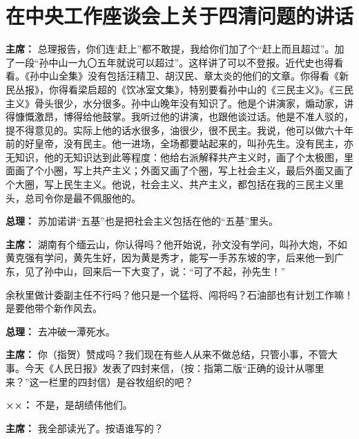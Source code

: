 \section[在中央工作座谈会上关于四清问题的讲话（一九六四年十二月二十日）]{在中央工作座谈会上关于四清问题的讲话}

\begin{duihua}

\item[\textbf{主席：}] 总理报告，你们连‘赶上”都不敢提，我给你们加了个“赶上而且超过”。加了一段“孙中山一九〇五年就说可以超过”。这样讲了可以不登报。近代史也得看看。《孙中山全集》没有包括汪精卫、胡汉民、章太炎的他们的文章。你得看《新民丛报》，你得看梁启超的《饮冰室文集》，特别要看孙中山的《三民主义》。《三民主义》骨头很少，水分很多。孙中山晚年没有知识了。他是个讲演家，煽动家，讲得慷慨激昂，博得给他鼓掌。我听过他的讲演，也跟他谈过话。他是不准人驳的，提不得意见的。实际上他的话水很多，油很少，很不民主。我说，他可以做六十年前的好皇帝，没有民主。他一进场，全场都要站起来的，叫孙先生。没有民主，亦无知识，他的无知识达到此等程度：他给右派解释共产主义时，画了个太极图，里面画了个小圈，写上共产主义；外面又画了个圈，写上社会主义，最后外面又画了个大圈，写上民生主义。他说，社会主义、共产主义，都包括在我的三民主义里头，总司令你是最不佩服他的。

\item[\textbf{总理：}] 苏加诺讲“五基”也是把社会主义包括在他的“五基”里头。

\item[\textbf{主席：}] 湖南有个缅云山，你认得吗？他开始说，孙文没有学问，叫孙大炮，不如黄克强有学问，黄先生好，因为黄是秀才，能写一手苏东坡的字，后来他一到广东，见了孙中山，回来后一下大变了，说：“可了不起，孙先生！”

余秋里做计委副主任不行吗？他只是一个猛将、闯将吗？石油部也有计划工作嘛！是要他带个新作风去。

\item[\textbf{总理：}] 去冲破一潭死水。

\item[\textbf{主席：}] 你（指贺）赞成吗？我们现在有些人从来不做总结，只管小事，不管大事。今天《人民日报》发表了四封来信，（按：指第二版“正确的设计从哪里来？”这一栏里的四封信）是谷牧组织的吧？

\item[\textbf{××：}] 不是，是胡绩伟他们。

\item[\textbf{主席：}] 我全部读光了。按语谁写的？


\end{duihua}
